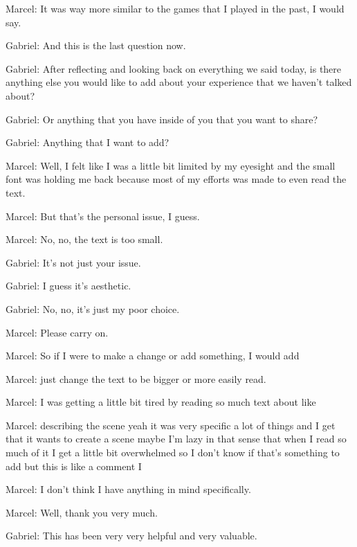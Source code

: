 Marcel: It was way more similar to the games that I played in the past, I would say.

Gabriel: And this is the last question now.

Gabriel: After reflecting and looking back on everything we said today, is there anything else you would like to add about your experience that we haven't talked about?

Gabriel: Or anything that you have inside of you that you want to share?

Gabriel: Anything that I want to add?

Marcel: Well, I felt like I was a little bit limited by my eyesight and the small font was holding me back because most of my efforts was made to even read the text.

Marcel: But that's the personal issue, I guess.

Marcel: No, no, the text is too small.

Gabriel: It's not just your issue.

Gabriel: I guess it's aesthetic.

Gabriel: No, no, it's just my poor choice.

Marcel: Please carry on.

Marcel: So if I were to make a change or add something, I would add

Marcel: just change the text to be bigger or more easily read.

Marcel: I was getting a little bit tired by reading so much text about like

Marcel: describing the scene yeah it was very specific a lot of things and I get that it wants to create a scene maybe I'm lazy in that sense that when I read so much of it I get a little bit overwhelmed so I don't know if that's something to add but this is like a comment I

Marcel: I don't think I have anything in mind specifically.

Marcel: Well, thank you very much.

Gabriel: This has been very very helpful and very valuable.